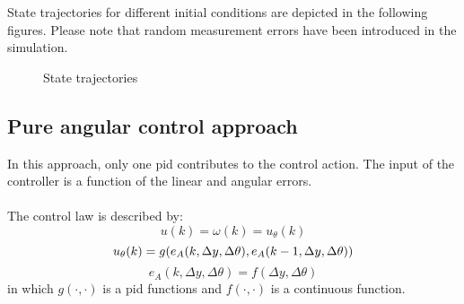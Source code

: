 State trajectories for different initial conditions are depicted in the following figures. Please note that random measurement errors have been introduced in the simulation.
\begin{center}
	\begin{figure}[H]
    \centering
    \qquad
    \caption{State trajectories}%
    \label{fig:comple_res}%
\end{figure}
\end{center}
{\color{PineGreen}\subsection{Pure angular control approach}\label{subsec:pure}}
In this approach, only one pid contributes to the control action. The input of the controller is a function of the linear and angular errors.\\
\\
The control law is described by:
\begin{equation}
    u(k) = \omega(k) = u_{\theta}(k)
\end{equation}
\begin{equation}
   	u_{\theta}(k) = g(e_{A}(k,\Delta y,\Delta \theta),e_{A}(k-1,\Delta y,\Delta \theta))\\
\end{equation}
\begin{equation}
    e_A(k,\Delta y,\Delta \theta) = f(\Delta y,\Delta \theta)
\end{equation}
in which $g(\cdot,\cdot)$ is a pid functions and $f(\cdot,\cdot)$ is a continuous function.\\

